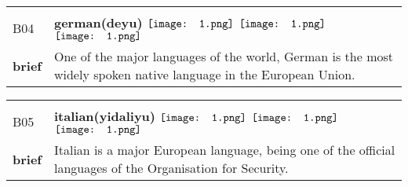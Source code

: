 \documentclass[UTF8]{article}
\begin{document}
            \begin{tabularx}{\textwidth}{p{1.5cm}X}
            \arrayrulecolor{myBlue}
        	\hline\\
            \small{B04}&
            \large{\bfseries{german(deyu)}}\hfill
                                                            \phantom{$\vcenter{\hbox{\texttt{[image: 1.png]}}}$}
                                                                $\vcenter{\hbox{\texttt{[image: 1.png]}}}$
                                                                $\vcenter{\hbox{\texttt{[image: 1.png]}}}$
                                                                \phantom{$\vcenter{\hbox{\texttt{[image: 1.png]}}}$}
                                                                \phantom{$\vcenter{\hbox{\texttt{[image: 1.png]}}}$}
                                                                $\vcenter{\hbox{\texttt{[image: 1.png]}}}$
                                                                \phantom{$\vcenter{\hbox{\texttt{[image: 1.png]}}}$}
                                        \\[10pt]
            \large{\bfseries{brief}}&\noindent\parbox[c]{\hsize}{One of the major languages of the world, German is the most widely spoken native language in the European Union.} \\[5pt]
            \hline\\[-10pt]
        \end{tabularx}
            \begin{tabularx}{\textwidth}{p{1.5cm}X}
            \arrayrulecolor{myBlue}
        	\hline\\
            \small{B05}&
            \large{\bfseries{italian(yidaliyu)}}\hfill
                                                            \phantom{$\vcenter{\hbox{\texttt{[image: 1.png]}}}$}
                                                                \phantom{$\vcenter{\hbox{\texttt{[image: 1.png]}}}$}
                                                                $\vcenter{\hbox{\texttt{[image: 1.png]}}}$
                                                                \phantom{$\vcenter{\hbox{\texttt{[image: 1.png]}}}$}
                                                                \phantom{$\vcenter{\hbox{\texttt{[image: 1.png]}}}$}
                                                                $\vcenter{\hbox{\texttt{[image: 1.png]}}}$
                                                                $\vcenter{\hbox{\texttt{[image: 1.png]}}}$
                                        \\[10pt]
            \large{\bfseries{brief}}&\noindent\parbox[c]{\hsize}{Italian is a major European language, being one of the official languages of the Organisation for Security.} \\[5pt]
            \hline\\[-10pt]
        \end{tabularx}
\end{document}

